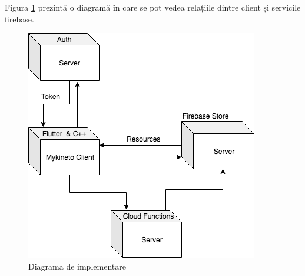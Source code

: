  Figura \ref{fig:uml-client-server} prezintă o diagramă în care se pot vedea relațiile dintre client și servicile firebase.
 
 \begin{figure}[htbp]
	\centerline{\includegraphics[scale=0.7]{fig/client-server.png}}  
	\caption{Diagrama de implementare}
	\label{fig:uml-client-server}
\end{figure}

